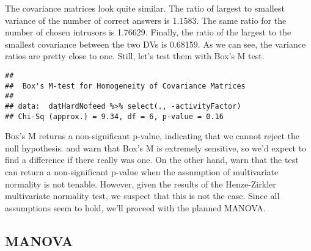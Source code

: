 \documentclass[12pt,]{article}
\newenvironment{Shaded}{\begin{snugshade}}{\end{snugshade}}
\newcommand{\DataTypeTok}[1]{\textcolor[rgb]{0.13,0.29,0.53}{#1}}
\newcommand{\KeywordTok}[1]{\textcolor[rgb]{0.13,0.29,0.53}{\textbf{#1}}}
\newcommand{\NormalTok}[1]{#1}
\newcommand{\OperatorTok}[1]{\textcolor[rgb]{0.81,0.36,0.00}{\textbf{#1}}}
\newcommand{\StringTok}[1]{\textcolor[rgb]{0.31,0.60,0.02}{#1}}
\begin{document}
The covariance matrices look quite similar. The ratio of largest to
smallest variance of the number of correct answers is 1.1583. The same
ratio for the number of chosen intrusors is 1.76629. Finally, the ratio
of the largest to the smallest covariance between the two DVs is
0.68159. As we can see, the variance ratios are pretty close to one.
Still, let's test them with Box's M test.

\begin{Shaded}
\end{Shaded}

\begin{verbatim}
## 
##  Box's M-test for Homogeneity of Covariance Matrices
## 
## data:  datHardNofeed %>% select(., -activityFactor)
## Chi-Sq (approx.) = 9.34, df = 6, p-value = 0.16
\end{verbatim}

Box's M returns a non-significant p-value, indicating that we cannot
reject the null hypothesis. \citet{field_discovering_2012} and
\citet{raykov_introduction_2008} warn that Box's M is extremely
sensitive, so we'd expect to find a difference if there really was one.
On the other hand, \citet{field_discovering_2012} warn that the test can
return a non-significant p-value when the assumption of multivariate
normality is not tenable. However, given the results of the
Henze-Zirkler multivariate normality test, we suspect that this is not
the case. Since all assumptions seem to hold, we'll proceed with the
planned MANOVA.

\hypertarget{manova}{%
\subsection{MANOVA}\label{manova}}


{
    
}
\end{document}
